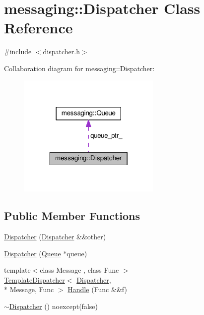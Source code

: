 \hypertarget{classmessaging_1_1Dispatcher}{\section{messaging\-:\-:Dispatcher Class Reference}
\label{classmessaging_1_1Dispatcher}
}


{\ttfamily \#include $<$dispatcher.\-h$>$}



Collaboration diagram for messaging\-:\-:Dispatcher\-:
\nopagebreak
\begin{figure}[H]
\begin{center}
\leavevmode
\includegraphics[width=196pt]{classmessaging_1_1Dispatcher__coll__graph}
\end{center}
\end{figure}
\subsection*{Public Member Functions}
\begin{DoxyCompactItemize}
\item 
\hyperlink{classmessaging_1_1Dispatcher_a80bdf7cb7e206ccb6709a74b1d015682}{Dispatcher} (\hyperlink{classmessaging_1_1Dispatcher}{Dispatcher} \&\&other)
\item 
\hyperlink{classmessaging_1_1Dispatcher_adb867c8b876c901d12154e12406e8ff8}{Dispatcher} (\hyperlink{classmessaging_1_1Queue}{Queue} $\ast$queue)
\item 
{\footnotesize template$<$class Message , class Func $>$ }\\\hyperlink{classmessaging_1_1TemplateDispatcher}{Template\-Dispatcher}$<$ \hyperlink{classmessaging_1_1Dispatcher}{Dispatcher}, \\*
Message, Func $>$ \hyperlink{classmessaging_1_1Dispatcher_a6d9d0bf1da266ca951c7821bc4e84f9f}{Handle} (Func \&\&f)
\item 
\hyperlink{classmessaging_1_1Dispatcher_ac17a4675e9a484de43bdf8914ab93d04}{$\sim$\-Dispatcher} () noexcept(false)
\end{DoxyCompactItemize}
